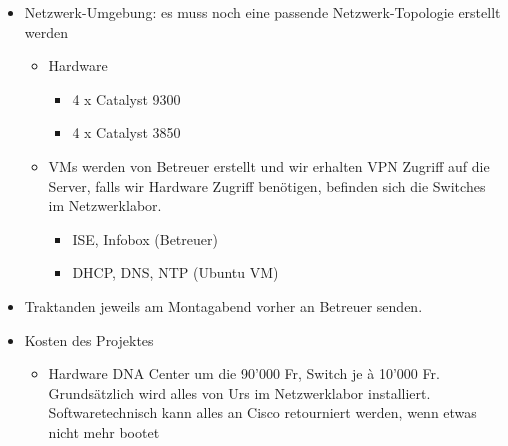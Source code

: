 \begin{itemize}
	\item Netzwerk-Umgebung: es muss noch eine passende Netzwerk-Topologie erstellt werden
	\begin{itemize}
		\item Hardware
		\begin{itemize}
			\item 4 x Catalyst 9300
			\item 4 x Catalyst 3850
		\end{itemize}
		\item VMs werden von Betreuer erstellt und wir erhalten VPN Zugriff auf die Server, falls wir Hardware Zugriff benötigen, befinden sich die Switches im Netzwerklabor.
		\begin{itemize}
			\item ISE, Infobox (Betreuer)
			\item DHCP, DNS, NTP (Ubuntu VM)
		\end{itemize}
	\end{itemize}
	\item Traktanden jeweils am Montagabend vorher an Betreuer senden.
	\item Kosten des Projektes
	\begin{itemize}
		\item Hardware DNA Center um die 90'000 Fr, Switch je à 10'000 Fr. Grundsätzlich wird alles von Urs im Netzwerklabor installiert. Softwaretechnisch kann alles an Cisco retourniert werden, wenn etwas nicht mehr bootet
	\end{itemize}
\end{itemize}

